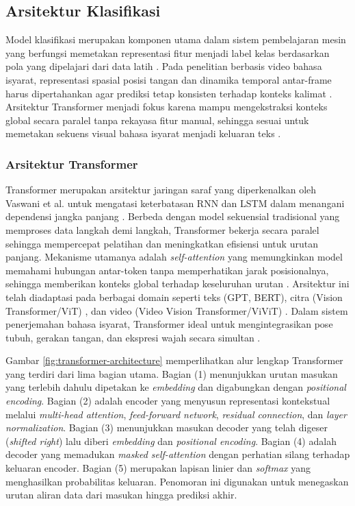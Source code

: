 \subsection{Arsitektur Klasifikasi} \label{II.teori4}
Model klasifikasi merupakan komponen utama dalam sistem pembelajaran mesin yang berfungsi memetakan representasi fitur menjadi label kelas berdasarkan pola yang dipelajari dari data latih \cite{IGoodfellow2016}. Pada penelitian berbasis video bahasa isyarat, representasi spasial posisi tangan dan dinamika temporal antar-frame harus dipertahankan agar prediksi tetap konsisten terhadap konteks kalimat \cite{Vaswani2023}. Arsitektur Transformer menjadi fokus karena mampu mengekstraksi konteks global secara paralel tanpa rekayasa fitur manual, sehingga sesuai untuk memetakan sekuens visual bahasa isyarat menjadi keluaran teks \cite{Aljabar2020}.\par

\subsubsection{Arsitektur Transformer} \label{II.Teori4.4}
Transformer merupakan arsitektur jaringan saraf yang diperkenalkan oleh Vaswani et al. untuk mengatasi keterbatasan RNN dan LSTM dalam menangani dependensi jangka panjang \cite{Vaswani2023}. Berbeda dengan model sekuensial tradisional yang memproses data langkah demi langkah, Transformer bekerja secara paralel sehingga mempercepat pelatihan dan meningkatkan efisiensi untuk urutan panjang. Mekanisme utamanya adalah \textit{self-attention} yang memungkinkan model memahami hubungan antar-token tanpa memperhatikan jarak posisionalnya, sehingga memberikan konteks global terhadap keseluruhan urutan \cite{Vaswani2023}. Arsitektur ini telah diadaptasi pada berbagai domain seperti teks (GPT, BERT), citra (Vision Transformer/ViT) \cite{Dosovitskiy2021}, dan video (Video Vision Transformer/ViViT) \cite{Arnab2021}. Dalam sistem penerjemahan bahasa isyarat, Transformer ideal untuk mengintegrasikan pose tubuh, gerakan tangan, dan ekspresi wajah secara simultan \cite{Saputra2024}.

Gambar \ref{fig:transformer-architecture} memperlihatkan alur lengkap Transformer yang terdiri dari lima bagian utama. Bagian (1) menunjukkan urutan masukan yang terlebih dahulu dipetakan ke \textit{embedding} dan digabungkan dengan \textit{positional encoding}. Bagian (2) adalah encoder yang menyusun representasi kontekstual melalui \textit{multi-head attention}, \textit{feed-forward network}, \textit{residual connection}, dan \textit{layer normalization}. Bagian (3) menunjukkan masukan decoder yang telah digeser (\textit{shifted right}) lalu diberi \textit{embedding} dan \textit{positional encoding}. Bagian (4) adalah decoder yang memadukan \textit{masked self-attention} dengan perhatian silang terhadap keluaran encoder. Bagian (5) merupakan lapisan linier dan \textit{softmax} yang menghasilkan probabilitas keluaran. Penomoran ini digunakan untuk menegaskan urutan aliran data dari masukan hingga prediksi akhir.\par

